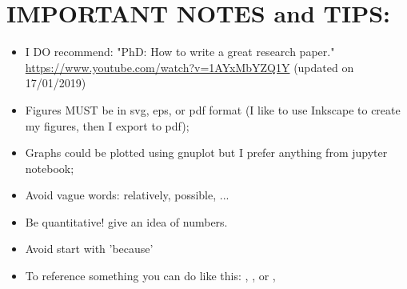\newpage\newpage
\section*{IMPORTANT NOTES and TIPS:}

\begin{itemize}
	\item I DO recommend: "PhD: How to write a great research paper." \url{https://www.youtube.com/watch?v=1AYxMbYZQ1Y} (updated on 17/01/2019)
	\item Figures MUST be in svg, eps, or pdf format (I like to use Inkscape to create my figures, then I export to pdf);
	\item Graphs could be plotted using gnuplot but I prefer anything from jupyter notebook; 
	\item Avoid vague words: relatively, possible, ... 
	\item Be quantitative! give an idea of numbers.
	\item Avoid start with 'because'
	\item To reference something you can do like this: \citep{justyna2015SBRC}, \citep{kerkers2014aims}, or \citet{jjsantanna2015IM2,jjsantanna2015IM1}, \citet{santanna2013aims} 

\end{itemize}

